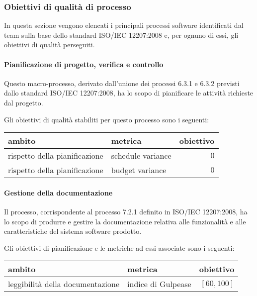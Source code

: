 		\subsubsection{Obiettivi di qualità di processo} \label{sec:ob_qual_proc}
		In questa sezione vengono elencati i principali processi software identificati dal team sulla base dello standard ISO/IEC 12207:2008 e, per ognuno di essi, gli obiettivi di qualità perseguiti.

\paragraph{Pianificazione di progetto, verifica e controllo}
Questo macro-processo, derivato dall'unione dei processi 6.3.1 e 6.3.2 previsti dallo standard ISO/IEC 12207:2008, ha lo scopo di pianificare le attività richieste dal progetto.

Gli obiettivi di qualità stabiliti per questo processo sono i seguenti:
\begin{center}
\begin{tabular}{| l | p{6cm} | r |}
	\hline
	\textbf{ambito} & \textbf{metrica} & \textbf{obiettivo} \\
	\hline
	rispetto della pianificazione & schedule variance & $0$ \\
	\hline
	rispetto della pianificazione & budget variance & $0$ \\
	\hline
\end{tabular}
\end{center}

\paragraph{Gestione della documentazione}
Il processo, corrispondente al processo 7.2.1 definito in ISO/IEC 12207:2008, ha lo scopo di produrre e gestire la documentazione relativa alle funzionalità e alle caratteristiche del sistema software prodotto.

Gli obiettivi di pianificazione e le metriche ad essi associate sono i seguenti:
\begin{center}
\begin{tabular}{| l | l | r |}
	\hline
	\textbf{ambito} & \textbf{metrica} & \textbf{obiettivo} \\
	\hline
	leggibilità della documentazione & indice di Gulpease & $[60, 100]$ \\
	\hline
\end{tabular}
\end{center}


